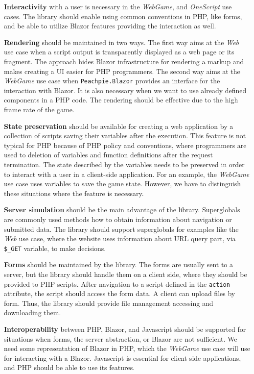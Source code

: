 \par
\textbf{Interactivity} with a user is necessary in the \textit{WebGame}, and \textit{OneScript} use cases.
The library should enable using common conventions in PHP, like forms, and be able to utilize Blazor features providing the interaction as well.
\par
\textbf{Rendering} should be maintained in two ways.
The first way aims at the \textit{Web} use case when a script output is transparently displayed as a web page or its fragment.
The approach hides Blazor infrastructure for rendering a markup and makes creating a UI easier for PHP programmers.
The second way aims at the \textit{WebGame} use case when \texttt{Peachpie.Blazor} provides an interface for the interaction with Blazor.
It is also necessary when we want to use already defined components in a PHP code.
The rendering should be effective due to the high frame rate of the game.
\par
\textbf{State preservation} should be available for creating a web application by a collection of scripts saving their variables after the execution.
This feature is not typical for PHP because of PHP policy and conventions, where programmers are used to deletion of variables and function definitions after the request termination.
The state described by the variables needs to be preserved in order to interact with a user in a client-side application. 
For an example, the \textit{WebGame} use case uses variables to save the game state. 
However, we have to distinguish these situations where the feature is necessary.
\par
\textbf{Server simulation} should be the main advantage of the library.
Superglobals are commonly used methods how to obtain information about navigation or submitted data.
The library should support superglobals for examples like the \textit{Web} use case, where the website uses information about URL query part, via \texttt{\$\_GET} variable, to make decisions.
\par
\textbf{Forms} should be maintained by the library. 
The forms are usually sent to a server, but the library should handle them on a client side, where they should be provided to PHP scripts.
After navigation to a script defined in the \texttt{action} attribute, the script should access the form data.
A client can upload files by form.
Thus, the library should provide file management accessing and downloading them.
\par
\textbf{Interoperability} between PHP, Blazor, and Javascript should be supported for situations when forms, the server abstraction, or Blazor are not sufficient.
We need some representation of Blazor in PHP, which the \textit{WebGame} use case will use for interacting with a Blazor.
Javascript is essential for client side applications, and PHP should be able to use its features.

